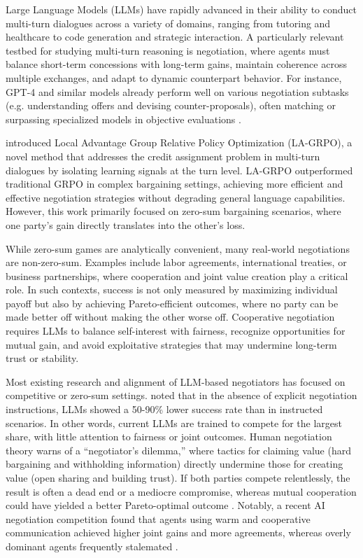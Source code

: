 \documentclass[12pt,a4paper]{article}
\begin{document}
Large Language Models (LLMs) have rapidly advanced in their ability to conduct multi-turn dialogues across a variety of domains, ranging from tutoring and healthcare to code generation and strategic interaction. A particularly relevant testbed for studying multi-turn reasoning is negotiation, where agents must balance short-term concessions with long-term gains, maintain coherence across multiple exchanges, and adapt to dynamic counterpart behavior. For instance, GPT-4 and similar models already perform well on various negotiation subtasks (e.g. understanding offers and devising counter-proposals), often matching or surpassing specialized models in objective evaluations \citep{kwon-etal-2024-llms}. 
\par
\citet{franceschetti2025advantage} introduced Local Advantage Group Relative Policy Optimization (LA-GRPO), a novel method that addresses the credit assignment problem in multi-turn dialogues by isolating learning signals at the turn level. LA-GRPO outperformed traditional GRPO in complex bargaining settings, achieving more efficient and effective negotiation strategies without degrading general language capabilities. However, this work primarily focused on zero-sum bargaining scenarios, where one party's gain directly translates into the other's loss.
\par
While zero-sum games are analytically convenient, many real-world negotiations are non-zero-sum. Examples include labor agreements, international treaties, or business partnerships, where cooperation and joint value creation play a critical role. In such contexts, success is not only measured by maximizing individual payoff but also by achieving Pareto-efficient outcomes, where no party can be made better off without making the other worse off. Cooperative negotiation requires LLMs to balance self-interest with fairness, recognize opportunities for mutual gain, and avoid exploitative strategies that may undermine long-term trust or stability.
\par
Most existing research and alignment of LLM-based negotiators has focused on competitive or zero-sum settings. \citet{jiang-akcakir-2025-explicit} noted that in the absence of explicit negotiation instructions, LLMs showed a 50-90\% lower success rate than in instructed scenarios. In other words, current LLMs are trained to compete for the largest share, with little attention to fairness or joint outcomes. Human negotiation theory warns of a ``negotiator's dilemma,'' where tactics for claiming value (hard bargaining and withholding information) directly undermine those for creating value (open sharing and building trust). If both parties compete relentlessly, the result is often a dead end or a mediocre compromise, whereas mutual cooperation could have yielded a better Pareto-optimal outcome \citep{lax1992manager_summary}. Notably, a recent AI negotiation competition found that agents using warm and cooperative communication achieved higher joint gains and more agreements, whereas overly dominant agents frequently stalemated \citep{vaccaro2025advancingainegotiationsnew}.
\end{document}
